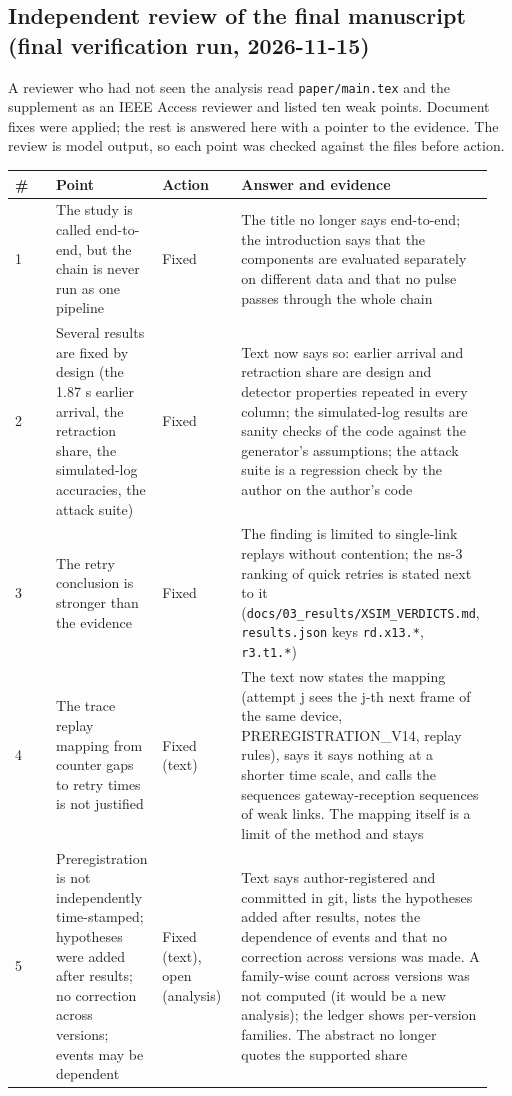 \subsection*{Independent review of the final manuscript (final verification run, 2026-11-15)}

A reviewer who had not seen the analysis read \texttt{paper/main.tex} and the supplement as an IEEE Access reviewer and listed ten weak points. Document fixes were applied; the rest is answered here with a pointer to the evidence. The review is model output, so each point was checked against the files before action.

{\scriptsize\raggedright
\begin{longtable}{p{0.237\linewidth}p{0.237\linewidth}p{0.237\linewidth}p{0.237\linewidth}}
\toprule
\# & Point & Action & Answer and evidence \\
\midrule
\endhead
1 & The study is called end-to-end, but the chain is never run as one pipeline & Fixed & The title no longer says end-to-end; the introduction says that the components are evaluated separately on different data and that no pulse passes through the whole chain \\
2 & Several results are fixed by design (the 1.87 s earlier arrival, the retraction share, the simulated-log accuracies, the attack suite) & Fixed & Text now says so: earlier arrival and retraction share are design and detector properties repeated in every column; the simulated-log results are sanity checks of the code against the generator's assumptions; the attack suite is a regression check by the author on the author's code \\
3 & The retry conclusion is stronger than the evidence & Fixed & The finding is limited to single-link replays without contention; the ns-3 ranking of quick retries is stated next to it (\texttt{docs/03\_results/XSIM\_VERDICTS.md}, \texttt{results.json} keys \texttt{rd.x13.*}, \texttt{r3.t1.*}) \\
4 & The trace replay mapping from counter gaps to retry times is not justified & Fixed (text) & The text now states the mapping (attempt j sees the j-th next frame of the same device, PREREGISTRATION\_V14, replay rules), says it says nothing at a shorter time scale, and calls the sequences gateway-reception sequences of weak links. The mapping itself is a limit of the method and stays \\
5 & Preregistration is not independently time-stamped; hypotheses were added after results; no correction across versions; events may be dependent & Fixed (text), open (analysis) & Text says author-registered and committed in git, lists the hypotheses added after results, notes the dependence of events and that no correction across versions was made. A family-wise count across versions was not computed (it would be a new analysis); the ledger shows per-version families. The abstract no longer quotes the supported share \\

\end{longtable}}
